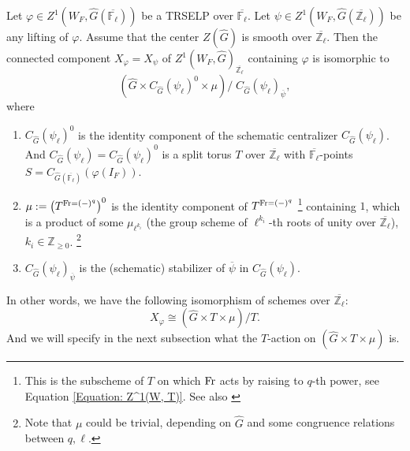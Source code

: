 \begin{theorem}\label{Thm X}
	Let $\varphi \in Z^1(W_F, \hat{G}(\overline{\mathbb{F}_{\ell}}))$ be a TRSELP over $\overline{\mathbb{F}_{\ell}}$. Let $\psi \in Z^1(W_F, \hat{G}(\overline{\mathbb{Z}_{\ell}}))$ be any lifting of $\varphi$. Assume that the center $Z(\hat{G})$ is smooth over $\overline{\mathbb{Z}_{\ell}}$. Then the connected component $X_{\varphi}=X_{\psi}$ of $Z^1(W_F, \hat{G})_{\overline{\mathbb{Z}_{\ell}}}$ containing $\varphi$ is isomorphic to 
	$$\left(\hat{G} \times C_{\hat{G}}(\psi_{\ell})^0 \times \mu\right)/\;C_{\hat{G}}(\psi_{\ell})_{\overline{\psi}},$$
	where
	\begin{enumerate}
		\item $C_{\hat{G}}(\psi_{\ell})^0$ is the identity component of the schematic centralizer $C_{\hat{G}}(\psi_{\ell})$. And $C_{\hat{G}}(\psi_{\ell})=C_{\hat{G}}(\psi_{\ell})^0$ is a split torus $T$ over $\overline{\mathbb{Z}_{\ell}}$ with $\overline{\mathbb{F}_{\ell}}$-points $S=C_{\hat{G}(\overline{\mathbb{F}_{\ell}})}(\varphi(I_F))$.
		\item $\mu:=\left(T^{\operatorname{Fr}=(-)^q}\right)^0$ is the identity component of $T^{\operatorname{Fr}=(-)^q}$ \footnote{This is the subscheme of $T$ on which $\operatorname{Fr}$ acts by raising to $q$-th power, see Equation \ref{Equation: Z^1(W, T)}. See also \cite[Example 3.14]{dat2022ihes}} containing $1$, which is a product of some $\mu_{\ell^{k_i}}$ (the group scheme of $\ell^{k_i}$-th roots of unity over $\overline{\mathbb{Z}_{\ell}}$), $k_i \in \mathbb{Z}_{\geq 0}$. \footnote{Note that $\mu$ could be trivial, depending on $\hat{G}$ and some congruence relations between $q, \ell$.}
		\item $C_{\hat{G}}(\psi_{\ell})_{\overline{\psi}}$ is the (schematic) stabilizer of $\overline{\psi}$ in $C_{\hat{G}}(\psi_{\ell})$.
	\end{enumerate}
    In other words, we have the following isomorphism of schemes over $\overline{\mathbb{Z}_{\ell}}$:
    $$X_{\varphi} \cong \left(\hat{G} \times T \times \mu\right)/T.$$
    And we will specify in the next subsection what the $T$-action on $\left(\hat{G} \times T \times \mu\right)$ is.
    

\end{theorem}
